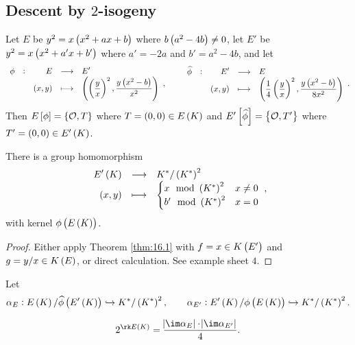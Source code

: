 \subsection{Descent by \texorpdfstring{$ 2 $}{2}-isogeny}


Let $ E $ be $ y^2 = x\br{x^2 + ax + b} $ where $ b\br{a^2 - 4b} \ne 0 $, let $ E' $ be $ y^2 = x\br{x^2 + a'x + b'} $ where $ a' = -2a $ and $ b' = a^2 - 4b $, and let
$$ \function[\phi]{E}{E'}{\br{x, y}}{\br{\br{\dfrac{y}{x}}^2, \dfrac{y\br{x^2 - b}}{x^2}}}, \qquad \function[\widehat{\phi}]{E'}{E}{\br{x, y}}{\br{\dfrac{1}{4}\br{\dfrac{y}{x}}^2, \dfrac{y\br{x^2 - b}}{8x^2}}}. $$
Then $ E\sbr{\phi} = \cbr{\OOO, T} $ where $ T = \br{0, 0} \in E\br{K} $ and $ E'\sbr{\widehat{\phi}} = \cbr{\OOO, T'} $ where $ T' = \br{0, 0} \in E'\br{K} $.

\begin{proposition}
There is a group homomorphism
$$ \function{E'\br{K}}{K^* / \br{K^*}^2}{\br{x, y}}{
\begin{cases}
x \mod \br{K^*}^2 & x \ne 0 \\
b' \mod \br{K^*}^2 & x = 0
\end{cases}
}, $$
with kernel $ \phi\br{E\br{K}} $.
\end{proposition}

\begin{proof}
Either apply Theorem \ref{thm:16.1} with $ f = x \in K\br{E'} $ and $ g = y / x \in K\br{E} $, or direct calculation. See example sheet $ 4 $.
\end{proof}

\pagebreak

Let
$$ \alpha_E : E\br{K} / \widehat{\phi}\br{E'\br{K}} \hookrightarrow K^* / \br{K^*}^2, \qquad \alpha_{E'} : E'\br{K} / \phi\br{E\br{K}} \hookrightarrow K^* / \br{K^*}^2. $$

\begin{lemma}
$$ 2^{\rk E\br{K}} = \dfrac{\abs{\im \alpha_E} \cdot \abs{\im \alpha_{E'}}}{4}. $$
\end{lemma}

